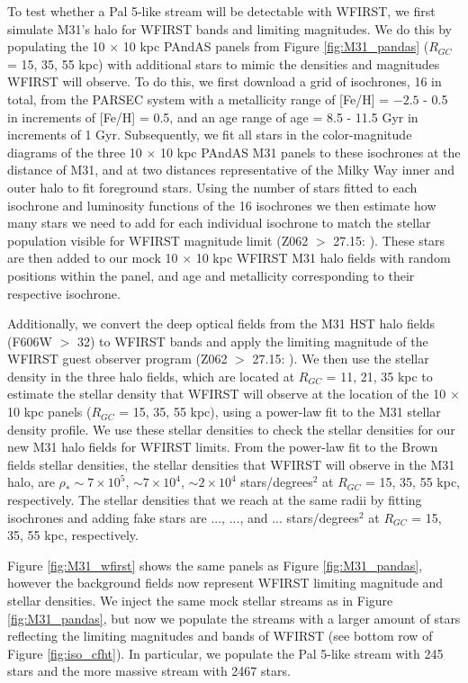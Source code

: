 \documentclass[twocolumn]{aastex62}
\begin{document}
To test whether a Pal 5-like stream will be detectable with WFIRST, we first simulate M31's halo for WFIRST bands and limiting magnitudes. We do this by populating the 10 $\times$ 10 kpc PAndAS panels from Figure \ref{fig:M31_pandas} ($R_{GC}$ = 15, 35, 55 kpc) with additional stars to mimic the densities and magnitudes WFIRST will observe. To do this, we first download a grid of isochrones, 16 in total, from the PARSEC system with a metallicity range of [Fe/H] = $-2.5$ - 0.5 in increments of [Fe/H] = 0.5, and an age range of age = 8.5 - 11.5 Gyr in increments of 1 Gyr. Subsequently, we fit all stars in the color-magnitude diagrams of the three 10 $\times$ 10 kpc  PAndAS M31 panels to these isochrones at the distance of M31, and at two distances representative of the Milky Way inner and outer halo to fit foreground stars. Using the number of stars fitted to each isochrone and luminosity functions of the 16 isochrones we then estimate how many stars we need to add for each individual isochrone to match the stellar population visible for WFIRST magnitude limit (Z062 $>$ 27.15: \citealt{spergel13}). These stars are then added to our mock 10 $\times$ 10 kpc WFIRST M31 halo fields with random positions within the panel, and age and metallicity corresponding to their respective isochrone.

Additionally, we convert the deep optical fields from the \citet{brown09} M31 HST halo fields (F606W $>$ 32) to WFIRST bands and apply the limiting magnitude of the WFIRST guest observer program (Z062 $>$ 27.15: \citealt{spergel13}). We then use the stellar density in the three \citet{brown09} halo fields, which are located at $R_{GC}$ = 11, 21, 35 kpc to estimate the stellar density that WFIRST will observe at the location of the 10 $\times$ 10 kpc panels ($R_{GC}$ = 15, 35, 55 kpc), using a power-law fit to the M31 stellar density profile. We use these stellar densities to check the stellar densities for our new M31 halo fields for WFIRST limits. From the power-law fit to the Brown fields stellar densities, the stellar densities that WFIRST will observe in the M31 halo, are $\rho_*  \sim 7 \times 10^5$,  $\sim7 \times 10^4$,  $\sim 2 \times 10^4$ stars/degrees$^2$ at  $R_{GC}$ = 15, 35, 55 kpc, respectively. The stellar densities that we reach at the same radii by fitting isochrones and adding fake stars are  $...$, $...$, and $...$ stars/degrees$^2$ at  $R_{GC}$ = 15, 35, 55 kpc, respectively.

Figure \ref{fig:M31_wfirst} shows the same panels as Figure \ref{fig:M31_pandas}, however the background fields now represent WFIRST limiting magnitude and stellar densities. We inject the same mock stellar streams as in Figure \ref{fig:M31_pandas}, but now we populate the streams with a larger amount of stars reflecting the limiting magnitudes and bands of WFIRST (see bottom row of Figure \ref{fig:iso_cfht}). In particular, we populate the Pal 5-like stream with 245 stars and the more massive stream with 2467 stars.
\end{document}
